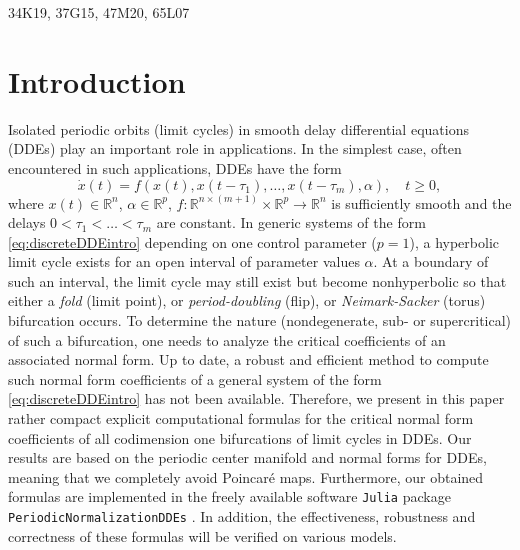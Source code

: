 \documentclass[english]{myarticle}
\begin{document}
\begin{MSCcodes}
34K19, 37G15, 47M20, 65L07
\end{MSCcodes}
\begin{sloppypar}


\section{Introduction} \label{sec:introduction}
Isolated periodic orbits (limit cycles) in smooth delay differential equations (DDEs) play an important role in applications. In the simplest case, often encountered in such applications, DDEs have the form
\begin{equation} \label{eq:discreteDDEintro}
    \dot{x}(t) = f(x(t),x(t-\tau_1),\dots,x(t - \tau_m),\alpha), \quad t \geq 0,
\end{equation}
where $x(t) \in \mathbb{R}^n$, $ \alpha \in \mathbb{R}^p$, $f: \mathbb{R}^{n \times (m+1)} \times \mathbb{R}^p \to \mathbb{R}^n$ is sufficiently smooth and the delays $0 < \tau_1 < \dots < \tau_m$ are constant. In generic systems of the form \eqref{eq:discreteDDEintro} depending on one
control parameter ($p = 1$), a hyperbolic limit cycle exists for an open interval of
parameter values $\alpha$. At a boundary of such an interval, the limit cycle may still exist but become nonhyperbolic so that either a \emph{fold} (limit point), or \emph{period-doubling} (flip), or \emph{Neimark-Sacker} (torus) bifurcation occurs. To determine the nature (nondegenerate, sub- or supercritical) of such a bifurcation, one needs to analyze the critical coefficients of an associated normal form. Up to date, a robust and efficient method to compute such normal form coefficients of a general system of the form \eqref{eq:discreteDDEintro} has not been available. Therefore, we present in this paper rather compact explicit computational formulas for the critical normal form coefficients of all codimension one bifurcations of limit cycles in DDEs. Our results are based on the periodic center manifold \cite{Article1} and normal forms \cite{Article2} for DDEs, meaning that we completely avoid Poincar\'e maps. Furthermore, our obtained formulas are implemented in the freely available software \verb|Julia| package \verb|PeriodicNormalizationDDEs| \cite{Bosschaert2024c}. In addition, the effectiveness, robustness and correctness of these formulas will be verified on various models.


\end{sloppypar}
\end{document}
